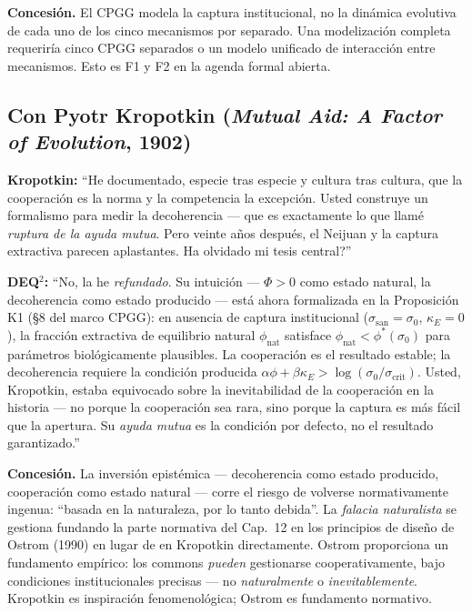 \textbf{Concesi\'{o}n.} El CPGG modela la captura institucional, no la
din\'{a}mica evolutiva de cada uno de los cinco mecanismos por separado.
Una modelizaci\'{o}n completa requerir\'{i}a cinco CPGG separados o un
modelo unificado de interacci\'{o}n entre mecanismos. Esto es F1 y F2 en
la agenda formal abierta.

\subsection{Con Pyotr Kropotkin (\emph{Mutual Aid: A Factor of
Evolution}, 1902)}\label{con-kropotkin-1902}

\textbf{Kropotkin:} ``He documentado, especie tras especie y cultura tras
cultura, que la cooperaci\'{o}n es la norma y la competencia la
excepci\'{o}n. Usted construye un formalismo para medir la decoherencia
--- que es exactamente lo que llam\'{e} \emph{ruptura de la ayuda mutua}.
Pero veinte a\~{n}os despu\'{e}s, el Neijuan y la captura extractiva
parecen aplastantes. \textquestiondown Ha olvidado mi tesis central?''

\textbf{DEQ$^2$:} ``No, la he \emph{refundado}. Su intuici\'{o}n ---
$\Phi > 0$ como estado natural, la decoherencia como estado producido ---
est\'{a} ahora formalizada en la Proposici\'{o}n K1 (§8 del marco CPGG):
en ausencia de captura institucional ($\sigma_{\text{san}} = \sigma_0$,
$\kappa_E = 0$), la fracci\'{o}n extractiva de equilibrio natural
$\phi_{\text{nat}}$ satisface $\phi_{\text{nat}} < \phi^*(\sigma_0)$ para
par\'{a}metros biol\'{o}gicamente plausibles. La cooperaci\'{o}n es el
resultado estable; la decoherencia requiere la condici\'{o}n producida
$\alpha\phi + \beta\kappa_E > \log(\sigma_0/\sigma_{\text{crit}})$. Usted,
Kropotkin, estaba equivocado sobre la inevitabilidad de la cooperaci\'{o}n
en la historia --- no porque la cooperaci\'{o}n sea rara, sino porque la
captura es m\'{a}s f\'{a}cil que la apertura. Su \emph{ayuda mutua} es la
condici\'{o}n por defecto, no el resultado garantizado.''

\textbf{Concesi\'{o}n.} La inversi\'{o}n epist\'{e}mica --- decoherencia
como estado producido, cooperaci\'{o}n como estado natural --- corre el
riesgo de volverse normativamente ingenua: ``basada en la naturaleza, por
lo tanto debida''. La \emph{falacia naturalista} se gestiona fundando la
parte normativa del Cap.~12 en los principios de dise\~{n}o de Ostrom
(1990) en lugar de en Kropotkin directamente. Ostrom proporciona un
fundamento emp\'{i}rico: los commons \emph{pueden} gestionarse
cooperativamente, bajo condiciones institucionales precisas --- no
\emph{naturalmente} o \emph{inevitablemente}. Kropotkin es
inspiraci\'{o}n fenomenol\'{o}gica; Ostrom es fundamento normativo.



